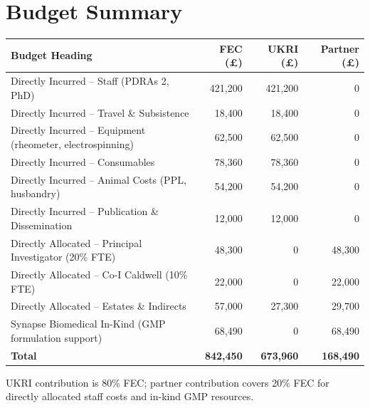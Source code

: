\documentclass[11pt,a4paper]{article}
\begin{document}
\par

\section{Budget Summary}

\vspace{4pt}

\begin{tabularx}{\linewidth}{@{} X r r r @{}}
\toprule
\rowcolor{ukriblue}
\color{white}\textbf{Budget Heading} &
\color{white}\textbf{FEC (\pounds)} &
\color{white}\textbf{UKRI (\pounds)} &
\color{white}\textbf{Partner (\pounds)} \\
\midrule
\rowcolor{ukrigray}
Directly Incurred -- Staff (PDRAs \texttimes{} 2, PhD) & 421,200 & 421,200 & 0 \\
\rowcolor{white}
Directly Incurred -- Travel \& Subsistence & 18,400 & 18,400 & 0 \\
\rowcolor{ukrigray}
Directly Incurred -- Equipment (rheometer, electrospinning) & 62,500 & 62,500 & 0 \\
\rowcolor{white}
Directly Incurred -- Consumables & 78,360 & 78,360 & 0 \\
\rowcolor{ukrigray}
Directly Incurred -- Animal Costs (PPL, husbandry) & 54,200 & 54,200 & 0 \\
\rowcolor{white}
Directly Incurred -- Publication \& Dissemination & 12,000 & 12,000 & 0 \\
\rowcolor{ukrigray}
Directly Allocated -- Principal Investigator (20\% FTE) & 48,300 & 0 & 48,300 \\
\rowcolor{white}
Directly Allocated -- Co-I Caldwell (10\% FTE) & 22,000 & 0 & 22,000 \\
\rowcolor{ukrigray}
Directly Allocated -- Estates \& Indirects & 57,000 & 27,300 & 29,700 \\
\rowcolor{white}
Synapse Biomedical In-Kind (GMP formulation support) & 68,490 & 0 & 68,490 \\
\midrule
\rowcolor{ukriblue!15}
\textbf{Total} & \textbf{842,450} & \textbf{673,960} & \textbf{168,490} \\
\bottomrule
\end{tabularx}

\vspace{6pt}
\noindent\textcolor{textgray}{\small UKRI contribution is 80\% FEC; partner contribution
covers 20\% FEC for directly allocated staff costs and in-kind GMP resources.}
\end{document}
